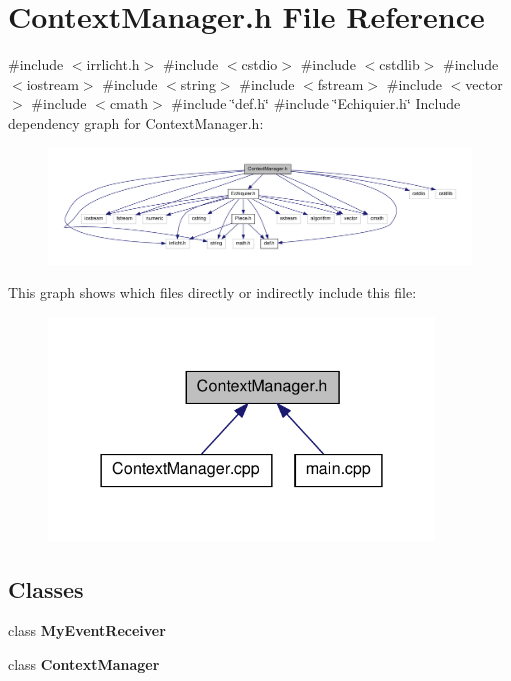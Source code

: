 \section{\-Context\-Manager.\-h \-File \-Reference}
\label{_context_manager_8h}
{\ttfamily \#include $<$irrlicht.\-h$>$}\*
{\ttfamily \#include $<$cstdio$>$}\*
{\ttfamily \#include $<$cstdlib$>$}\*
{\ttfamily \#include $<$iostream$>$}\*
{\ttfamily \#include $<$string$>$}\*
{\ttfamily \#include $<$fstream$>$}\*
{\ttfamily \#include $<$vector$>$}\*
{\ttfamily \#include $<$cmath$>$}\*
{\ttfamily \#include \char`\"{}def.\-h\char`\"{}}\*
{\ttfamily \#include \char`\"{}\-Echiquier.\-h\char`\"{}}\*
\-Include dependency graph for \-Context\-Manager.\-h\-:
\nopagebreak
\begin{figure}[H]
\begin{center}
\leavevmode
\includegraphics[width=350pt]{_context_manager_8h__incl}
\end{center}
\end{figure}
\-This graph shows which files directly or indirectly include this file\-:
\nopagebreak
\begin{figure}[H]
\begin{center}
\leavevmode
\includegraphics[width=290pt]{_context_manager_8h__dep__incl}
\end{center}
\end{figure}
\subsection*{\-Classes}
\begin{DoxyCompactItemize}
\item 
class {\bf \-My\-Event\-Receiver}
\item 
class {\bf \-Context\-Manager}
\end{DoxyCompactItemize}
